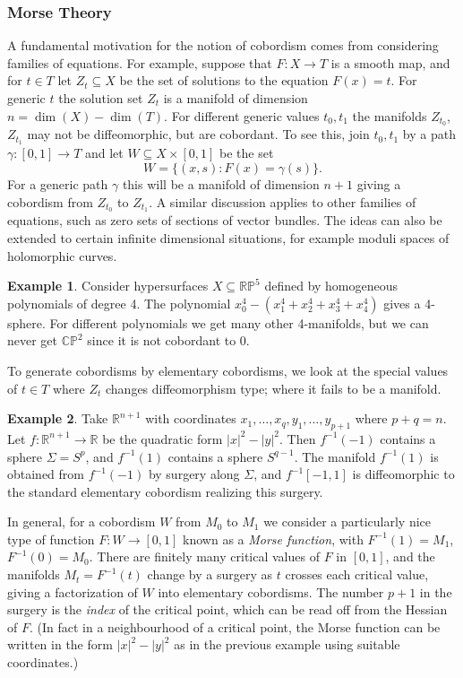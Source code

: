 \documentclass{article}
\theoremstyle{definition}
\newtheorem*{example}{Example}
\newcommand{\RP}{\mathbb{RP}}
\newcommand{\CP}{\mathbb{CP}}
\newcommand{\R}{\mathbb{R}}
\begin{document}
\subsubsection*{Morse Theory}

A fundamental motivation for the notion of cobordism comes from considering
families of equations. For example, suppose that $F:X\to T$ is a smooth map, and
for $t\in T$ let $Z_t\subseteq X$ be the set of solutions to the equation
$F(x)=t$. For generic $t$ the solution set $Z_t$ is a manifold of dimension
$n=\dim(X)-\dim(T)$. For different generic values $t_0,t_1$ the manifolds
$Z_{t_0}$, $Z_{t_1}$ may not be diffeomorphic, but are cobordant. To see this,
join $t_0,t_1$ by a path $\gamma:[0,1]\to T$ and let $W\subseteq X\times[0,1]$
be the set
\begin{equation*}
    W = \{(x,s):F(x)=\gamma(s)\}.
\end{equation*}
For a generic path $\gamma$ this will be a manifold of dimension $n+1$ giving a
cobordism from $Z_{t_0}$ to $Z_{t_1}$. A similar discussion applies to other
families of equations, such as zero sets of sections of vector bundles. The
ideas can also be extended to certain infinite dimensional situations, for
example moduli spaces of holomorphic curves.

\begin{example}
    Consider hypersurfaces $X\subseteq\RP^5$ defined by homogeneous polynomials
    of degree 4. The polynomial $x_0^4-(x_1^4+x_2^4+x_3^4+x_4^4)$ gives a
    4-sphere. For different polynomials we get many other 4-manifolds, but we
    can never get $\CP^2$ since it is not cobordant to 0.
\end{example}

To generate cobordisms by elementary cobordisms, we look at the special values
of $t\in T$ where $Z_t$ changes diffeomorphism type; where it fails to be a
manifold.

\begin{example}
    Take $\R^{n+1}$ with coordinates $x_1,\ldots,x_q,y_1,\ldots,y_{p+1}$ where
    $p+q=n$. Let $f:\R^{n+1}\to\R$ be the quadratic form $|x|^2-|y|^2$. Then
    $f^{-1}(-1)$ contains a sphere $\Sigma=S^p$, and $f^{-1}(1)$ contains a
    sphere $S^{q-1}$. The manifold $f^{-1}(1)$ is obtained from $f^{-1}(-1)$ by
    surgery along $\Sigma$, and $f^{-1}[-1,1]$ is diffeomorphic to the standard
    elementary cobordism realizing this surgery.
\end{example}

In general, for a cobordism $W$ from $M_0$ to $M_1$ we consider a particularly
nice type of function $F:W\to[0,1]$ known as a \emph{Morse function}, with
$F^{-1}(1)=M_1$, $F^{-1}(0)=M_0$. There are finitely many critical values of $F$
in $[0,1]$, and the manifolds $M_t=F^{-1}(t)$ change by a surgery as $t$ crosses
each critical value, giving a factorization of $W$ into elementary cobordisms.
The number $p+1$ in the surgery is the \emph{index} of the critical point, which
can be read off from the Hessian of $F$. (In fact in a neighbourhood of a
critical point, the Morse function can be written in the form $|x|^2-|y|^2$ as
in the previous example using suitable coordinates.)
\end{document}
